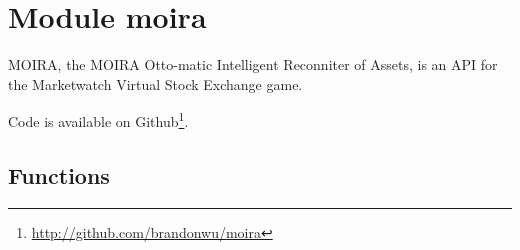 %
%
%


\section{Module moira}

    \label{moira}
MOIRA, the MOIRA Otto-matic Intelligent Reconniter of Assets, is an API for
the Marketwatch Virtual Stock Exchange game.

Code is available on 
Github\footnote{\href{http://github.com/brandonwu/moira}{http://github.com/brandonwu/moira}}.



  \subsection{Functions}

    \label{moira:get_current_holdings}

    \vspace{0.5ex}

